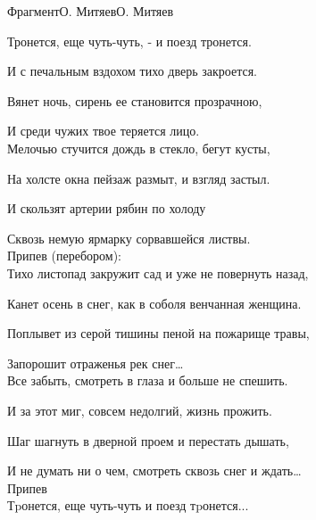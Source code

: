 \documentclass[11pt,a5paper]{book}
\begin{document}
\begin{song}{Фрагмент}{}{О. Митяев}{О. Митяев}{}{}

Тронется, еще чуть-чуть, - и поезд тронется.\par
И с печальным вздохом тихо дверь закроется.\par
Вянет ночь, сирень ее становится прозрачною,\par
И среди чужих твое теряется лицо.\\
 
Мелочью стучится дождь в стекло, бегут кусты,\par
На холсте окна пейзаж размыт, и взгляд застыл.\par
И скользят артерии рябин по холоду\par
Сквозь немую ярмарку сорвавшейся листвы.\\
 
Припев (перебором):\\

Тихо листопад закружит сад и уже не повернуть назад,\par
Канет осень в снег, как в соболя венчанная женщина.\par
Поплывет из серой тишины пеной на пожарище травы,\par
Запорошит отраженья рек снег…\\
 
Все забыть, смотреть в глаза и больше не спешить.\par
И за этот миг, совсем недолгий, жизнь прожить.\par
Шаг шагнуть в дверной проем и перестать дышать,\par
И не думать ни о чем, смотреть сквозь снег и ждать…\\

 
Припев\\

Тpонется, еще чуть-чуть и поезд тpонется...

\end{song}
\end{document}
